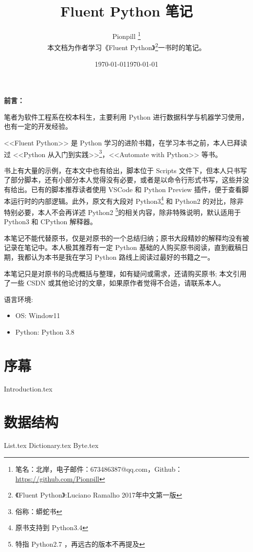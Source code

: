\documentclass{PionpillNote-book}
\title{Fluent Python 笔记}
\author{
    Pionpill \footnote{笔名：北岸，电子邮件：673486387@qq.com，Github：\url{https://github.com/Pionpill}} \\
    本文档为作者学习《Fluent Python》\footnote{《Fluent Python》:Luciano Ramalho 2017年中文第一版}一书时的笔记。\\
}
\date{\today}
\begin{document}
\pagestyle{plain}
\maketitle

\noindent\textbf{前言：}

笔者为软件工程系在校本科生，主要利用 Python 进行数据科学与机器学习使用，也有一定的开发经验。

<<Fluent Python>> 是  Python 学习的进阶书籍，在学习本书之前，本人已拜读过 <<Python 从入门到实践>>\footnote{俗称：蟒蛇书}，<<Automate with Python>> 等书。

书上有大量的示例，在本文中也有给出，脚本位于 Scripts 文件下，但本人只书写了部分脚本，还有小部分本人觉得没有必要，或者是以命令行形式书写，这些并没有给出。已有的脚本推荐读者使用 VSCode 和 Python Preview 插件，便于查看脚本运行时的内部逻辑。此外，原文有大段对 Python3\footnote{原书支持到 Python3.4} 和 Python2 的对比，除非特别必要，本人不会再详述 Python2 \footnote{特指 Python2.7 ，再远古的版本不再提及}的相关内容，除非特殊说明，默认适用于 Python3 和 CPython 解释器。

本笔记不能代替原书，仅是对原书的一个总结归纳；原书大段精妙的解释均没有被记录在笔记中。本人极其推荐有一定 Python 基础的人购买原书阅读，直到截稿日期，我都认为本书是我在学习 Python 路线上阅读过最好的书籍之一。

本笔记只是对原书的马虎概括与整理，如有疑问或需求，还请购买原书; 本文引用了一些 CSDN 或其他论讨的文章，如果原作者觉得不合适，请联系本人。

语言环境:
\begin{itemize}
    \item OS: Window11
    \item Python: Python 3.8
\end{itemize}

\date{\today}
\tableofcontents
\newpage

\setcounter{page}{1} 
\pagestyle{fancy}

\chapter{序幕}
{Introduction.tex}

\chapter{数据结构}
{List.tex}
{Dictionary.tex}
{Byte.tex}
\end{document}
